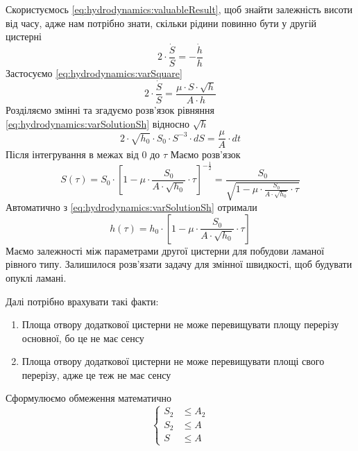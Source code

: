 Скористуємось \eqref{eq:hydrodynamics:valuableResult}, щоб знайти
залежність висоти від часу, адже нам потрібно знати, скільки рідини повинно
бути у другій цистерні
\begin{equation*}
  2 \cdot \frac{\dot{S}}{S}
  = - \frac{\dot{h}}{h}
\end{equation*}
Застосуємо \eqref{eq:hydrodynamics:varSquare}
\begin{equation*}
  2 \cdot \frac{\dot{S}}{S}
  = \frac{\mu \cdot S \cdot \sqrt{h}}{A \cdot h}
\end{equation*}
Розділяємо змінні та згадуємо розв’язок рівняння
\eqref{eq:hydrodynamics:varSolutionSh} відносно $\sqrt{h}$
\begin{equation*}
  2 \cdot \sqrt{h_0} \cdot S_0
    \cdot S^{-3} \cdot dS
  = \frac{\mu}{A} \cdot dt
\end{equation*}
Після інтегрування в межах від $0$ до $\tau$ Маємо розв’язок
\begin{equation*}
  S\left( \tau \right)
  = S_0
    \cdot \left[ 1 - \mu
      \cdot \frac{S_0}{A \cdot \sqrt{h_0}} \cdot \tau\right]^{- \frac{1}{2}}
  = \frac{S_0}{\sqrt{1 - \mu
      \cdot \frac{S_0}{A \cdot \sqrt{h_0}} \cdot \tau}}
\end{equation*}
Автоматично з \eqref{eq:hydrodynamics:varSolutionSh} отримали
\begin{equation*}
  h\left( \tau \right)
  = h_0 \cdot \left[ 1 - \mu
      \cdot \frac{S_0}{A \cdot \sqrt{h_0}} \cdot \tau \right]
\end{equation*}
Маємо залежності між параметрами другої цистерни для побудови ламаної рівного
типу.
Залишилося розв’язати задачу для змінної швидкості, щоб будувати опуклі ламані.

Далі потрібно врахувати такі факти:
\begin{enumerate}
  \item Площа отвору додаткової цистерни не може перевищувати площу перерізу
    основної, бо це не має сенсу
  \item Площа отвору додаткової цистерни не може перевищувати площі свого
    перерізу, адже це теж не має сенсу
\end{enumerate}
Сформулюємо обмеження математично
\begin{equation*}
  \begin{cases}
    S_2 &\le A_2 \\
    S_2 &\le A \\
    S   &\le A
  \end{cases}
\end{equation*}
